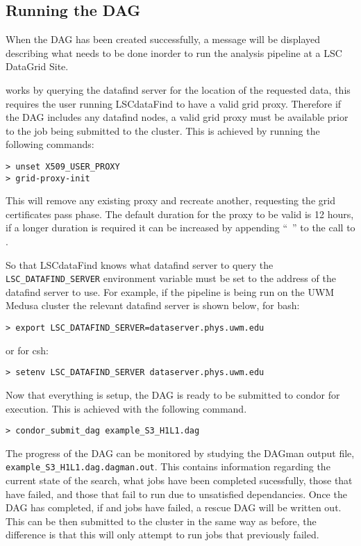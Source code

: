 \subsection{Running the DAG}

When the DAG has been created successfully, a message will be displayed
describing what needs to be done inorder to run the analysis pipeline at
a LSC DataGrid Site.

 works by querying the datafind server for the
location of the requested data, this requires the user running
LSCdataFind to have a valid grid proxy. Therefore if the DAG includes
any datafind nodes, a valid grid proxy must be available prior to the
job being submitted to the cluster. This is achieved by running the
following commands:

\begin{verbatim}
> unset X509_USER_PROXY
> grid-proxy-init
\end{verbatim}

This will remove any existing proxy and recreate another, requesting the
grid certificates pass phase. The default duration for the proxy to be
valid is 12 hours, if a longer duration is required it can be increased
by appending ``~'' to the call to
.

So that LSCdataFind knows what datafind server to query the
\texttt{LSC\_DATAFIND\_SERVER} environment variable must be set to the
address of the datafind server to use. For example, if the pipeline is
being run on the UWM Medusa cluster the relevant datafind server is
shown below, for bash:

\begin{verbatim}
> export LSC_DATAFIND_SERVER=dataserver.phys.uwm.edu
\end{verbatim}

\noindent or for csh:

\begin{verbatim}
> setenv LSC_DATAFIND_SERVER dataserver.phys.uwm.edu
\end{verbatim}

Now that everything is setup, the DAG is ready to be submitted to condor
for execution. This is achieved with the following command.

\begin{verbatim}
> condor_submit_dag example_S3_H1L1.dag
\end{verbatim}

The progress of the DAG can be monitored by studying the DAGman output
file, \texttt{example\_S3\_H1L1.dag.dagman.out}. This contains
information regarding the current state of the search, what jobs have
been completed sucessfully, those that have failed, and those that fail
to run due to unsatisfied dependancies. Once the DAG has completed, if
and jobs have failed, a rescue DAG will be written out. This can be then
submitted to the cluster in the same way as before, the difference is
that this will only attempt to run jobs that previously failed.

